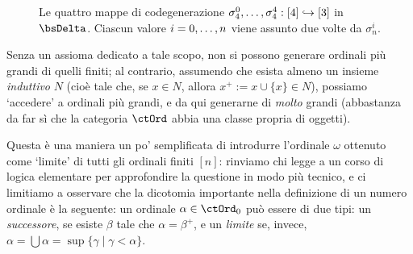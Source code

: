 \begin{figure}
\begin{center}
	\end{center}
	\caption{Le quattro mappe di codegenerazione \(\sigma_4^0,\dots,\sigma_4^4 : [4]\hookrightarrow [3]\) in \(\bsDelta\). Ciascun valore \(i=\iter[0] n\) viene assunto due volte da \(\sigma_n^i\).}
	\label{fig:cofa}
\end{figure}
\begin{remark}\label{tipi_di_ordinaly}
	Senza un assioma dedicato a tale scopo, non si possono generare ordinali più grandi di quelli finiti; al contrario, assumendo che esista almeno un insieme \emph{induttivo} \(N\) (cioè tale che, se \(x\in N\), allora \(x^+:=x\cup\{x\}\in N\)), possiamo `accedere' a ordinali più grandi, e da qui generarne di \emph{molto} grandi (abbastanza da far sì che la categoria \(\ctOrd\) abbia una classe propria di oggetti).

	Questa è una maniera un po' semplificata di introdurre l'ordinale \(\omega\) ottenuto come `limite' di tutti gli ordinali finiti \([n]\): rinviamo chi legge a un corso di logica elementare per approfondire la questione in modo più tecnico, e ci limitiamo a osservare che la dicotomia importante nella definizione di un numero ordinale è la seguente: un ordinale \(\alpha\in\ctOrd_0\) può essere di due tipi: un \emph{successore}, se esiste \(\beta\) tale che \(\alpha=\beta^+\), e un \emph{limite} se, invece, \(\alpha=\bigcup\alpha=\sup\{\gamma\mid \gamma < \alpha\}\).
\end{remark}
